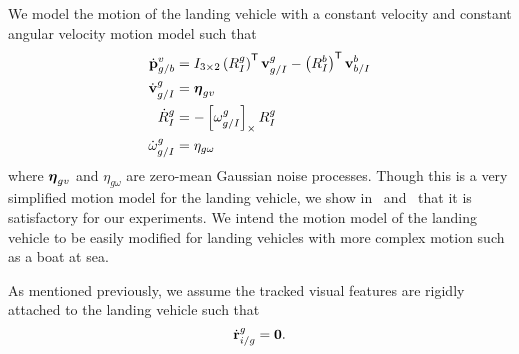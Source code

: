 We model the motion of the landing vehicle
with a constant velocity and constant
angular velocity motion model such that
\begin{align}
  \dot{\boldsymbol{\mathrm{p}}}_{g/b}^{v} &= I_{3 \times 2} \left( R_{I}^{g} \right)^{\mathsf{T}}
   \boldsymbol{\mathrm{v}}_{g/I}^{g} - \left( R_{I}^{b} \right)^{\mathsf{T}}
  \boldsymbol{\mathrm{v}}_{b/I}^{b} \label{eq:goal_dynamics} \\
  \dot{\boldsymbol{\mathrm{v}}}_{g/I}^{g} &= \boldsymbol{\mathrm{\eta}}_{gv} \nonumber \\
  \dot{R}_{I}^{g} &= -\left[  \omega_{g/I}^g  \right]_{\times} R_I^g \nonumber \\
  \dot{\omega}_{g/I}^{g} &= \eta_{g\omega} \nonumber
\end{align}
where $\boldsymbol{\mathrm{\eta}}_{gv}$ and $\eta_{g\omega}$ are zero-mean Gaussian noise
processes. Though this is a very simplified motion model for the landing
vehicle, we show in~
and~ that it is
satisfactory for our experiments. We intend the motion model of the landing
vehicle to be easily modified for landing vehicles with more complex motion such
as a boat at sea.

As mentioned previously, we assume the tracked visual features are rigidly
attached to the landing vehicle such that
\begin{equation}
  \dot{\boldsymbol{\mathrm{r}}}_{i/g}^g = \boldsymbol{\mathrm{0}}. \label{eq:feature_dynamics}
\end{equation}

